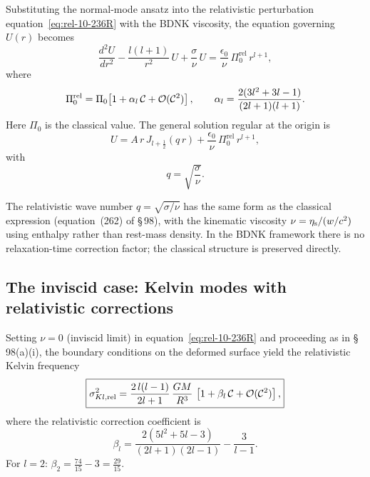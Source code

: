 Substituting the normal-mode ansatz into the relativistic perturbation
equation~\eqref{eq:rel-10-236R} with the BDNK viscosity, the equation
governing $U(r)$ becomes
\begin{equation}\label{eq:rel-10-260R}
  \frac{d^{2}U}{dr^{2}}
  - \frac{l(l+1)}{r^{2}}\,U
  + \frac{\sigma}{\nu}\,U
  = \frac{\epsilon_{0}}{\nu}\,
    \Pi_{0}^{\mathrm{rel}}\,r^{l+1},
\end{equation}
where
\begin{equation}\label{eq:rel-10-Pi0rel}
  \Pi_{0}^{\mathrm{rel}}
  = \Pi_{0}\!\left[1 + \alpha_{l}\,\mathcal{C}
                     + \mathcal{O}(\mathcal{C}^{2})\right],
  \qquad
  \alpha_{l} = \frac{2(3l^{2}+3l-1)}{(2l+1)(l+1)}.
\end{equation}
Here $\Pi_{0}$ is the classical value.  The general solution regular
at the origin is
\begin{equation}\label{eq:rel-10-261R}
  U = A\,r\,J_{l+\frac{1}{2}}(q\,r)
    + \frac{\epsilon_{0}}{\nu}\,
      \Pi_{0}^{\mathrm{rel}}\,r^{l+1},
\end{equation}
with
\begin{equation}\label{eq:rel-10-262R}
  q
  = \sqrt{\frac{\sigma}{\nu}}.
\end{equation}

\begin{relcorrection}
The relativistic wave number $q = \sqrt{\sigma/\nu}$ has the same
form as the classical expression (equation~(262) of \S\,98), with
the kinematic viscosity $\nu = \eta_{\mathrm{s}}/(w/c^2)$ using
enthalpy rather than rest-mass density.  In the BDNK framework
there is no relaxation-time correction factor; the classical
structure is preserved directly.
\end{relcorrection}

\subsection{The inviscid case: Kelvin modes with relativistic
corrections}\label{sec:rel-10-98-kelvin}

Setting $\nu = 0$ (inviscid limit) in
equation~\eqref{eq:rel-10-236R} and proceeding as in \S\,98(a)(i),
the boundary conditions on the deformed surface yield the relativistic
Kelvin frequency
\begin{equation}\label{eq:rel-10-258R}
  \boxed{
  \sigma_{Kl,\mathrm{rel}}^{2}
  = \frac{2\,l(l-1)}{2l+1}\,\frac{GM}{R^{3}}\,
    \left[1 + \beta_{l}\,\mathcal{C}
          + \mathcal{O}(\mathcal{C}^{2})\right],
  }
\end{equation}
where the relativistic correction coefficient is
\begin{equation}\label{eq:rel-10-beta}
  \beta_{l}
  = \frac{2(5l^{2}+5l-3)}{(2l+1)(2l-1)}
  - \frac{3}{l-1}.
\end{equation}
For $l = 2$: $\beta_{2} = \tfrac{74}{15} - 3 = \tfrac{29}{15}$.


